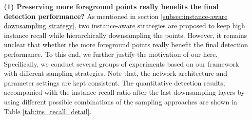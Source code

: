 \begin{table}[h]
\vspace{-0.2cm}
   \begin{minipage}[t]{0.49\textwidth}
   \begin{center}
   \end{center}
   \end{minipage}
   \caption{}
   \label{tab:effi_sample}
  \vspace{-0.3cm}
   \end{table}


\smallskip\noindent\textbf{(1) Preserving more foreground points really benefits the final detection performance?}  As mentioned in section \ref{subsec:instance-aware downsampling strategy}, two instance-aware strategies are proposed to keep high instance recall while hierarchically downsampling the points. However, it remains unclear that whether the more foreground points really benefit the final detection performance. To this end, we further justify the motivation of our \nickname{} here. Specifically, we conduct several groups of experiments based on our framework with different sampling strategies. Note that, the network architecture and parameter settings are kept consistent. The quantitative detection results, accompanied with the instance recall ratio after the last downsampling layers by using different possible combinations of the sampling approaches are shown in Table \ref{tab:ins_recall_detail}.

